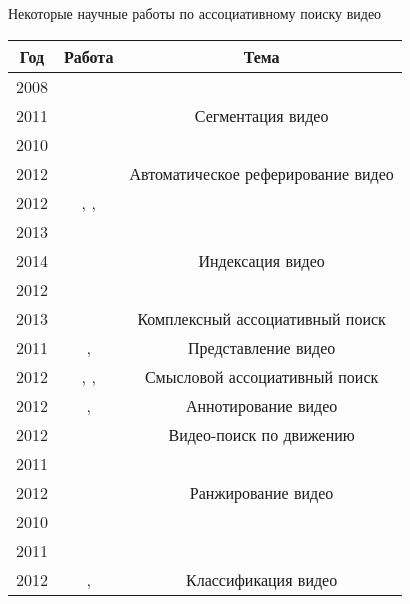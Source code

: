 \begin{dtable}{Некоторые научные работы по ассоциативному поиску видео}

    \renewcommand{\arraystretch}{1.4}

    \begin{tabular}{|c|c|c|}
        \hline
            Год
            & Работа
            & Тема
        \\
        \hline
        \hline
            2008 & \cite{Haase:95} & \\
            2011 & \cite{Kumar:2011}
            & \multirow{-2}{*}{Сегментация видео}
        \\
        \hline
            2010 & \cite{Fu:2010} & \\
            2012 & \cite{Wang:2012}
            & \multirow{-2}{*}{Автоматическое реферирование видео}
        \\
        \hline
            2012 & \cite{Chen:2012}, \cite{Zha:2012}, \cite{Wu:2012} & \\
            2013 & \cite{Paul:2013} & \\
            2014 & \cite{Nabeel:2014}
            & \multirow{-3}{*}{Индексация видео}
        \\
        \hline
            2012 & \cite{Huurnink:2012} & \\
            2013 & \cite{Tamizharasan:2013}
            & \multirow{-2}{*}{Комплексный ассоциативный поиск}
        \\
        \hline
            2011
            & \cite{Karpenko:2011}, \cite{Xiangang:2011}
            & Представление видео
        \\
        \hline
            2012
            & \cite{Jiang:2012}, \cite{Yu:2012}, \cite{Andre:2012}
            & Смысловой ассоциативный поиск
        \\
        \hline
            2012
            & \cite{Zhang:2012}, \cite{Yu:2012}
            & Аннотирование видео
        \\
        \hline
            2012
            & \cite{Wei-Ta:2012}
            & Видео-поиск по движению
        \\
        \hline
            2011 & \cite{XinmieTian:2011} & \\
            2012 & \cite{Zhang:2012}
            & \multirow{-2}{*}{Ранжирование видео}
        \\
        \hline
            2010 & \cite{Tahayna:2010} & \\
            2011 & \cite{Sargin:2011} & \\
            2012 & \cite{JaeDeok:2012}, \cite{Ionescu:2012}
            & \multirow{-3}{*}{Классификация видео}
        \\
        \hline
    \end{tabular}
\end{dtable}

